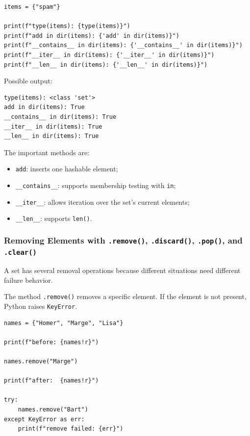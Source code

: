 \begin{verbatim}
items = {"spam"}

print(f"type(items): {type(items)}")
print(f"add in dir(items): {'add' in dir(items)}")
print(f"__contains__ in dir(items): {'__contains__' in dir(items)}")
print(f"__iter__ in dir(items): {'__iter__' in dir(items)}")
print(f"__len__ in dir(items): {'__len__' in dir(items)}")
\end{verbatim}

Possible output:

\begin{verbatim}
type(items): <class 'set'>
add in dir(items): True
__contains__ in dir(items): True
__iter__ in dir(items): True
__len__ in dir(items): True
\end{verbatim}

The important methods are:

\begin{itemize}
    \item \texttt{add}: inserts one hashable element;
    \item \texttt{\_\_contains\_\_}: supports membership testing with \texttt{in};
    \item \texttt{\_\_iter\_\_}: allows iteration over the set's current elements;
    \item \texttt{\_\_len\_\_}: supports \texttt{len()}.
\end{itemize}

\subsubsection{Removing Elements with \texttt{.remove()}, \texttt{.discard()}, \texttt{.pop()}, and \texttt{.clear()}}

A set has several removal operations because different situations need different failure behavior.

The method \texttt{.remove()} removes a specific element. If the element is not present, Python raises \texttt{KeyError}.

\begin{verbatim}
names = {"Homer", "Marge", "Lisa"}

print(f"before: {names!r}")

names.remove("Marge")

print(f"after:  {names!r}")

try:
    names.remove("Bart")
except KeyError as err:
    print(f"remove failed: {err}")
\end{verbatim}

